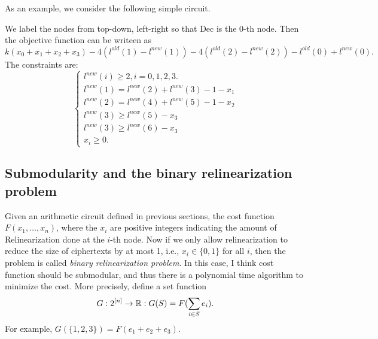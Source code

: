 \documentclass[11pt]{article} %
\theoremstyle{plain}
\theoremstyle{definition}
\begin{document}
As an example, we consider the following simple circuit. 
\begin{center}
\end{center}

We label the nodes from top-down, left-right so that Dec is the 0-th node. Then the objective function 
can be writeen as 
\[
	k(x_0 + x_1 + x_2 + x_3 )  - 4( l^{old}(1) - l^{new}(1) )  -  4( l^{old}(2) - l^{new}(2) )  -  l^{old}(0) + l^{new}(0). 
\]	
The constraints are:  \\
\[
\begin{cases}
l^{new}(i) \geq 2,  i  = 0,1,2,3.  \\
l^{new}(1) = l^{new}(2) + l^{new}(3) -1 - x_1 \\
l^{new}(2) = l^{new}(4) + l^{new}(5) -1 - x_2 \\
l^{new}(3) \geq l^{new}(5) - x_3 \\ 
l^{new}(3) \geq l^{new}(6) - x_3 \\
x_i \geq 0. 
\end{cases}
\]

\subsection{Submodularity and the binary relinearization problem}

Given an arithmetic circuit defined in previous sections, the cost function $F(x_1, \ldots, x_n)$, where the $x_i$ are positive integers indicating the amount of Relinearization done at the $i$-th node. Now if we only allow relinearization to reduce the size of ciphertexts by at most 1, i.e., $x_i \in \{0, 1\}$ for all $i$, then the problem is called \emph{binary relinearization problem}. In this case, I think cost function should be submodular, and thus there is a polynomial time algorithm to minimize the cost. More precisely, define a set function 
\[
	G: 2^{[n]} \to \mathbb{R}: G(S) = F(\sum_{i \in S}e_i). 
\]
For example, $G(\{1,2,3\}) = F(e_1 + e_2 + e_3)$.  
\end{document}
